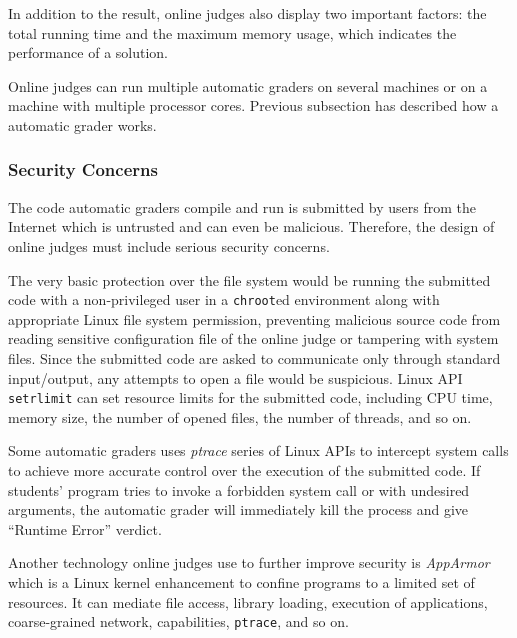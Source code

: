             In addition to the result, online judges also display two important factors:
            the total running time and the maximum memory usage,
            which indicates the performance of a solution.

            Online judges can run multiple automatic graders on several machines or
            on a machine with multiple processor cores.
            Previous subsection has described how a automatic grader works.

        \subsubsection{Security Concerns}

            The code automatic graders compile and run is submitted by users from the Internet
            which is untrusted and can even be malicious.
            Therefore, the design of online judges must include serious security concerns.

            The very basic protection over the file system would be running the submitted code
            with a non-privileged user in a \texttt{chroot}ed environment
            along with appropriate Linux file system permission,
            preventing malicious source code from reading sensitive configuration file of the online judge
            or tampering with system files.
            Since the submitted code are asked to communicate only through standard input/output,
            any attempts to open a file would be suspicious.
            Linux API \texttt{setrlimit} can set resource limits for the submitted code,
            including CPU time, memory size, the number of opened files, the number of threads, and so on.

            Some automatic graders uses \emph{ptrace} series of Linux APIs to intercept system calls to
            achieve more accurate control over the execution of the submitted code.
            If students' program tries to invoke a forbidden system call or with undesired arguments,
            the automatic grader will immediately kill the process and give ``Runtime Error'' verdict.

            Another technology online judges use to further improve security is \emph{AppArmor}
            which is a Linux kernel enhancement to confine programs to a limited set of resources.
            It can mediate file access, library loading, execution of applications, coarse-grained network,
            capabilities, \texttt{ptrace}, and so on.

